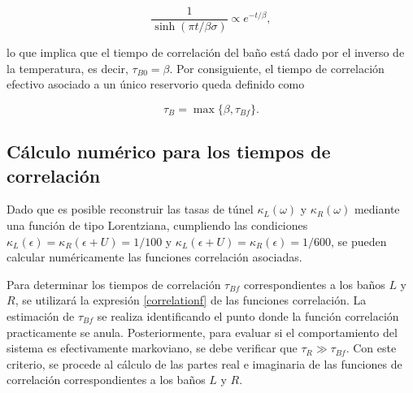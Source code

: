 \begin{appendixs}
\[
\frac{1}{\sinh(\pi t/\beta \sigma)} \propto e^{-t/\beta},
\]

lo que implica que el tiempo de correlación del baño está dado por el inverso de la temperatura, es decir, $\tau_{B0} = \beta$. Por consiguiente, el tiempo de correlación efectivo asociado a un único reservorio queda definido como

\[
\tau_{B} = \max \{\beta, \tau_{Bf}\}.
\]

\label{appendix5correlation}

\subsection{Cálculo numérico para los tiempos de correlación}
Dado que es posible reconstruir las tasas de túnel $\kappa_{L}(\omega)$ y $\kappa_{R}(\omega)$ mediante una función de tipo Lorentziana, cumpliendo las condiciones $\kappa_{L}(\epsilon) = \kappa_{R}(\epsilon+U) = 1/100$ y $\kappa_{L}(\epsilon+U) = \kappa_{R}(\epsilon) = 1/600$, se pueden calcular numéricamente las funciones correlación asociadas. 

Para determinar los tiempos de correlación $\tau_{Bf}$ correspondientes a los baños $L$ y $R$, se utilizará la expresión \ref{correlationf} de las funciones correlación. La estimación de $\tau_{Bf}$ se realiza identificando el punto donde la función correlación practicamente se anula. Posteriormente, para evaluar si el comportamiento del sistema es efectivamente markoviano, se debe verificar que $\tau_{R} \gg \tau_{Bf}$. Con este criterio, se procede al cálculo de las partes real e imaginaria de las funciones de correlación correspondientes a los baños $L$ y $R$.






\end{appendixs}
